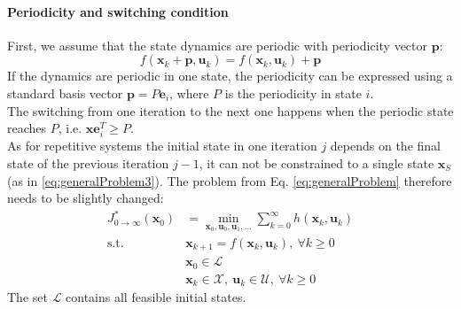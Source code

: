 \paragraph{Periodicity and switching condition}
First, we assume that the state dynamics are periodic with periodicity vector $\bm{p}$:
\begin{equation}
f(\bm{x}_k+\bm{p},\bm{u}_k) = f(\bm{x}_k,\bm{u}_k)+\bm{p}
\end{equation}
If the dynamics are periodic in one state, the periodicity can be expressed using a standard basis vector $\bm{p}=P\bm{e}_i$, where $P$ is the periodicity in state $i$.\\
The switching from one iteration to the next one happens when the periodic state reaches $P$, i.e. $\bm{xe}_i^T\geq P$.\\
As for repetitive systems the initial state in one iteration $j$ depends on the final state of the previous iteration $j-1$, it can not be constrained to a single state $\bm{x}_S$ (as in \eqref{eq:generalProblem3}). The problem from Eq. \eqref{eq:generalProblem} therefore needs to be slightly changed:
\begin{subequations}\label{eq:generalNewProblem}
\begin{align}
J_{0\rightarrow \infty}^*(\bm{x}_0)&=\min_{\bm{x}_0,\bm{u}_0,\bm{u}_1,\ldots} \sum\limits_{k=0}^{\infty} h(\bm{x}_k,\bm{u}_k)\\
\textrm{s.t. }
&\bm{x}_{k+1}=f(\bm{x}_k,\bm{u}_k),~\forall k\geq 0 \\
&\bm{x}_0 \in \mathcal{L} \\
&\bm{x}_k \in \mathcal{X},~\bm{u}_k \in \mathcal{U},~\forall k\geq 0
\end{align}
\end{subequations}
The set $\mathcal{L}$ contains all feasible initial states.


